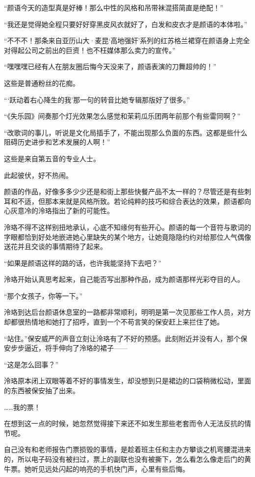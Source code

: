 \documentclass[UTF8, scheme = chinese, openany]{ctexbook}
\begin{document}
“颜语今天的造型真是好棒！那么中性的风格和吊带袜混搭简直是绝配！”

“我还是觉得她全程只要好好穿黑皮风衣就好了，白发和皮衣才是颜语的本体啦。”

“不不不！那条来自亚历山大·麦昆‘高地强奸’系列的红苏格兰裙穿在颜语身上完全对得起公司之前出的巨资！也不枉媒体那么卖力的宣传。”

“嘿嘿嘿已经有人在朋友圈后悔今天没来了，颜语表演的刀舞超帅的！”

这些是普通粉丝的花痴。

“‘跃动着右心降生的我’那一句的转音比她专辑那版好了很多。”

“《失乐园》间奏那个灯光效果怎么感觉和茉莉瓜乐团两年前那个有些雷同啊？”

“改歌词的事儿，听说是文化局插手了，不能出现那么负面的东西。这都是些什么阻碍历史进步和艺术发展的人啊！”

这些是来自第五音的专业人士。

此起彼伏，好不热闹。

颜语的作品，好像多多少少还是和街上那些快餐产品不太一样的？尽管还是有些刺耳和不适，但那本来就是风格所致。若论纯粹的技巧和综合表达的效果，颜语都向心灰意冷的泠珞指出了新的可能性。

泠珞不得不这样别扭地承认，心底不知缘何有些开心。颜语的每一个音符与歌词的字眼都恰到好处地嵌进她心里缺失的某个地方，让她竟隐隐约约对给那位人气偶像送花并且交谈的事情期待了起来。

“如果是颜语这样的路的话，也许我能坚持下去吧？”

泠珞开始认真思考起来，自己能否写出那种作品，成为颜语那样光彩夺目的人。

\vspace{1.5em}

“那个女孩子，你等一下。”

泠珞到达后台颜语休息室的一路都非常顺利，明明是第一次见那些工作人员，对方却都很热情地和她打了招呼，直到一个不苟言笑的保安赶上来拦住了她。

“站住。”保安威严的声音立刻让泠珞有了不好的预感。此刻附近并没有人，那个保安步步逼近，将手伸向了泠珞的裙子——

“这是怎么回事？”

泠珞原本闭上双眼等着不好的事情发生，却没想到只是裙边的口袋稍微松动，里面的东西被保安抽了出来。

……我的票！

在想到这一点的时候，她忽然觉得接下来还不如发生那些老套而令人无法反抗的情节呢。

自己没有和老师报告门票损毁的事情，是趁着班主任和主办方攀谈之机弯腰混进来的，所以电子码没有被扫过，票上的副联也没有被撕下，怎么看怎么像走后门的黄牛票。她听见远处闪起的响亮的手机快门声，心里有些后悔。
\end{document}
